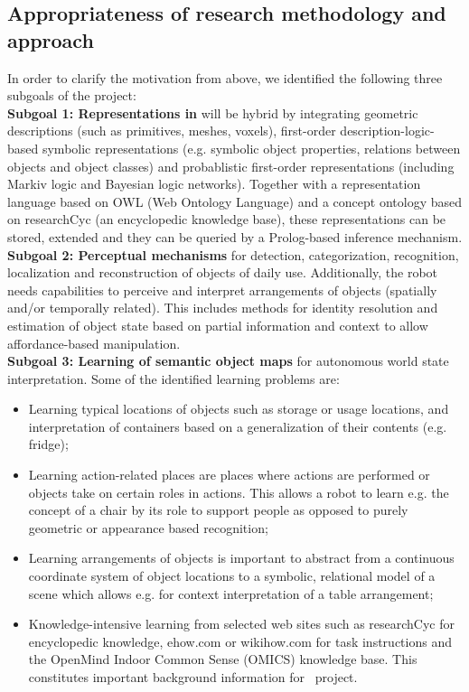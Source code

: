 \subsection{Appropriateness of research methodology and approach}
\label{sec:q2}
In order to clarify the motivation from above, we identified
the following three subgoals of the project: \\
\textbf{Subgoal 1: Representations in \ksem} will be hybrid by
  integrating geometric descriptions (such as primitives, meshes,
  voxels), first-order description-logic-based symbolic representations
  (e.g. symbolic object properties, relations between objects and object
  classes) and probablistic first-order representations (including
  Markiv logic and Bayesian logic networks).
  Together with a representation language based on OWL (Web Ontology
  Language) and a concept ontology based on researchCyc (an encyclopedic
  knowledge base), these representations can be stored, extended and
  they can be queried by a Prolog-based inference mechanism.\\
\textbf{Subgoal 2: Perceptual mechanisms} for detection,
  categorization, recognition, localization and reconstruction of
  objects of daily use. Additionally, the robot needs capabilities to
  perceive and interpret arrangements of objects (spatially and/or
  temporally related). This includes methods for identity resolution and
  estimation of object state based on partial information and context to
  allow affordance-based manipulation. \\
\textbf{Subgoal 3: Learning of semantic object maps} for autonomous world state
  interpretation. Some of the identified learning problems are:
  \begin{itemize}
    \item Learning typical locations of objects such as storage or
      usage locations, and interpretation of containers based on a
      generalization of their contents (e.g. fridge);
    \item Learning action-related places are places where actions are
      performed or objects take on certain roles in actions. This allows
      a robot to learn e.g. the concept of a chair by its role to
      support people as opposed to purely geometric or appearance
      based recognition;
    \item Learning arrangements of objects is important to abstract from
      a continuous coordinate system of object locations to a symbolic,
      relational model of a scene which allows e.g. for context
      interpretation of a table arrangement;
    \item Knowledge-intensive learning from selected web sites such as
      researchCyc for encyclopedic knowledge, ehow.com or wikihow.com
      for task instructions and the OpenMind Indoor Common Sense (OMICS)
      knowledge base. This constitutes important background information
      for \ksem\ project.
  \end{itemize}
